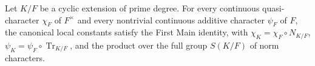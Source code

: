 \begin{theorem}\label{mod:main}
Let $K/F$ be a cyclic extension of prime degree.  For every continuous
quasi-character $\chi_F$ of $F^\times$ and every nontrivial continuous
additive character $\psi_F$ of $F$, the canonical local constants satisfy
the First Main identity, with $\chi_K=\chi_F\circ N_{K/F}$,
$\psi_K=\psi_F\circ\operatorname{Tr}_{K/F}$, and the product over the full
group $S(K/F)$ of norm characters.
\leanok
{}
\FormalizationContract
\end{theorem}
